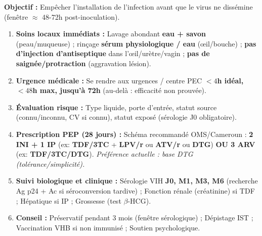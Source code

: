 \documentclass[11pt]{article}
\begin{document}
\begin{methode}
\textbf{Objectif :} Empêcher l'installation de l'infection avant que le virus ne dissémine (fenêtre $\approx$ 48-72h post-inoculation).
\begin{enumerate}
    \item \textbf{Soins locaux immédiats :} Lavage abondant \textbf{eau + savon} (peau/muqueuse) ; rinçage \textbf{sérum physiologique / eau} (œil/bouche) ; \textbf{pas d'injection d'antiseptique} dans l'œil/urètre/vagin ; \textbf{pas de saignée/protraction} (aggravation lésion).
    \item \textbf{Urgence médicale :} Se rendre aux urgences / centre PEC \textbf{$< 4$h idéal, $< 48$h max, jusqu'à 72h} (au-delà : efficacité non prouvée).
    \item \textbf{Évaluation risque :} Type liquide, porte d'entrée, statut source (connu/inconnu, CV si connu), statut exposé (sérologie J0 obligatoire).
    \item \textbf{Prescription PEP (28 jours) :} Schéma recommandé OMS/Cameroun : \textbf{2 INI + 1 IP} (ex: \textbf{TDF/3TC} + \textbf{LPV/r} ou \textbf{ATV/r} ou \textbf{DTG}) \textbf{OU 3 ARV} (ex: \textbf{TDF/3TC/DTG}). \textit{Préférence actuelle : base DTG (tolérance/simplicité).}
    \item \textbf{Suivi biologique et clinique :} Sérologie VIH \textbf{J0, M1, M3, M6} (recherche Ag p24 + Ac si séroconversion tardive) ; Fonction rénale (créatinine) si TDF ; Hépatique si IP ; Grossesse (test $\beta$-HCG).
    \item \textbf{Conseil :} Préservatif pendant 3 mois (fenêtre sérologique) ; Dépistage IST ; Vaccination VHB si non immunisé ; Soutien psychologique.
\end{enumerate}
\end{methode}
\end{document}
